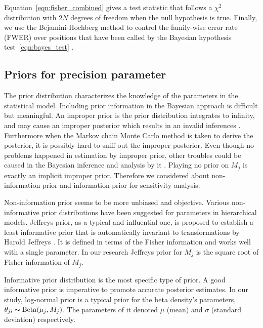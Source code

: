\documentclass[11pt,reqno]{amsart}
\begin{document}
Equation~\eqref{eqn:fisher_combined} gives a test statistic that follows a $\chi^2$ distribution with $2N$ degrees of freedom when the null hypothesis is true.
Finally, we use the Bejamini-Hochberg method to control the family-wise error rate (FWER) over positions that have been called by the Bayesian hypothesis test~\eqref{eqn:bayes_test} \citep{benjamini1995controlling, efron2010large}.

\subsection{Priors for precision parameter}
The prior distribution characterizes the knowledge of the parameters in the statistical model. Including prior information in the Bayesian approach is difficult but meaningful.
An improper prior is the prior distribution integrates to infinity, and may cause an improper posterior which results in an invalid inferences \citep{lesaffre2012bayesian}.
Furthermore when the Markov chain Monte Carlo method is taken to derive the posterior, it is possibly hard to sniff out the improper posterior.
Even though no problems happened in estimation by improper prior, other troubles could be caused in the Bayesian inference and analysis by it \citep{stein1965approximation}.
Playing no prior on $ M_{j}$ is exactly an implicit improper prior. Therefore we considered about non-information prior and information prior for sensitivity analysis.

Non-information prior seems to be more unbiased and objective.
Various non-informative prior distributions have been suggested for parameters in hierarchical models.
Jeffreys prior, as a typical and influential one, is proposed to establish a least informative prior that is automatically invariant to transformations by Harold Jeffreys \citep{jeffreys1946invariant}.
It is defined in terms of the Fisher information and works well with a single parameter. In our research Jeffreys prior for $M_j$ is the square root of Fisher information of $M_j$.

Informative prior distribution is the most specific type of prior. A good informative prior is imperative to promote accurate posterior estimates.
In our study, log-normal prior is a typical prior for the beta density's parameters, $\theta_{ji} \thicksim \text{Beta}(\mu_j, M_j)$.
The parameters of it denoted $\mu$ (mean) and $\sigma$ (standard deviation) respectively.
\end{document}
